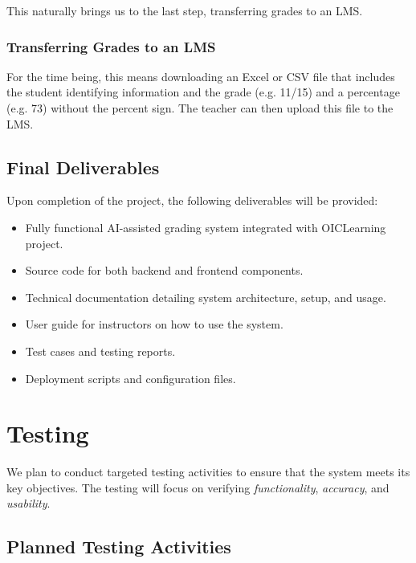 \documentclass[ms,twoside,print]{nuthesis}
\begin{document}
This naturally brings us to the last step, transferring grades to an LMS.

\subsection{Transferring Grades to an LMS}

For the time being, this means downloading an Excel or CSV file that includes the student identifying information and the grade (e.g. 11/15) and a percentage (e.g. 73) without the percent sign. The teacher can then upload this file to the LMS.

\section{Final Deliverables}

Upon completion of the project, the following deliverables will be provided:

\begin{itemize}
    \item Fully functional AI-assisted grading system integrated with OICLearning project.
    \item Source code for both backend and frontend components.
    \item Technical documentation detailing system architecture, setup, and usage.
    \item User guide for instructors on how to use the system.
    \item Test cases and testing reports.
    \item Deployment scripts and configuration files.
\end{itemize}

\chapter{Testing}

We plan to conduct targeted testing activities to ensure that the system meets its key objectives. The testing will focus on verifying \emph{functionality}, \emph{accuracy}, and \emph{usability}.

\section{Planned Testing Activities}
\end{document}
